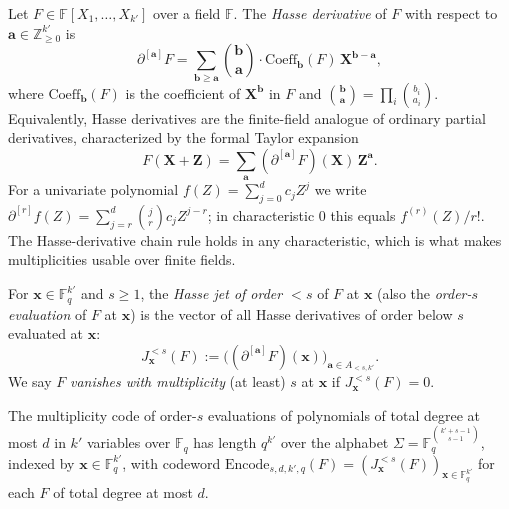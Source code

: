 \begin{definition}
    Let $F \in \mathbb{F}[X_1,\dots,X_{k'}]$ over a field $\mathbb{F}$.  The
    \emph{Hasse derivative} of $F$ with respect to
    $\mathbf{a} \in \mathbb{Z}_{\geq 0}^{k'}$ is
    \[
        \partial^{[\mathbf{a}]} F
        = \sum_{\mathbf{b} \geq \mathbf{a}}
        \binom{\mathbf{b}}{\mathbf{a}} \cdot \mathrm{Coeff}_{\mathbf{b}}(F)\,
        \mathbf{X}^{\mathbf{b}-\mathbf{a}},
    \]
    where $\mathrm{Coeff}_{\mathbf{b}}(F)$ is the coefficient of
    $\mathbf{X}^{\mathbf{b}}$ in $F$ and
    $\binom{\mathbf{b}}{\mathbf{a}} = \prod_i \binom{b_i}{a_i}$.  Equivalently,
    Hasse derivatives are the finite-field analogue of ordinary partial
    derivatives, characterized by the formal Taylor expansion
    \[
        F(\mathbf{X}+\mathbf{Z})
        = \sum_{\mathbf{a}} (\partial^{[\mathbf{a}]}
        F)(\mathbf{X})\,\mathbf{Z}^{\mathbf{a}}.
    \]
    For a univariate polynomial $f(Z) = \sum_{j=0}^{d} c_j Z^j$ we write
    $\partial^{[r]} f(Z) = \sum_{j=r}^{d} \binom{j}{r} c_j Z^{j-r}$; in
    characteristic $0$ this equals $f^{(r)}(Z)/r!$.  The Hasse-derivative chain
    rule holds in any characteristic, which is what makes multiplicities usable
    over finite fields.
\end{definition}

\begin{definition}
    For $\mathbf{x} \in \mathbb{F}_q^{k'}$ and $s \geq 1$, the \emph{Hasse jet
        of
        order $<s$} of $F$ at $\mathbf{x}$ (also the \emph{order-$s$
        evaluation} of
    $F$ at $\mathbf{x}$) is the vector of all Hasse derivatives of order below
    $s$ evaluated at $\mathbf{x}$:
    \[
        J_{\mathbf{x}}^{<s}(F) := \bigl((\partial^{[\mathbf{a}]}
        F)(\mathbf{x})\bigr)_{\mathbf{a} \in A_{<s,k'}}.
    \]
    We say $F$ \emph{vanishes with multiplicity} (at least) $s$ at $\mathbf{x}$
    if $J_{\mathbf{x}}^{<s}(F) = 0$.
\end{definition}

\begin{definition}
    The multiplicity code of order-$s$ evaluations of polynomials of total
    degree
    at most $d$ in $k'$ variables over $\mathbb{F}_q$ has length $q^{k'}$ over
    the
    alphabet $\Sigma = \mathbb{F}_q^{\binom{k'+s-1}{s-1}}$, indexed by
    $\mathbf{x} \in \mathbb{F}_q^{k'}$, with codeword
    $\mathrm{Encode}_{s,d,k',q}(F) = (J_{\mathbf{x}}^{<s}(F))_{\mathbf{x} \in
        \mathbb{F}_q^{k'}}$ for each $F$ of total degree at most $d$.
\end{definition}

